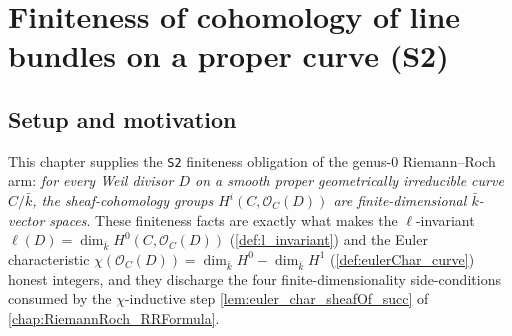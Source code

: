 \chapter{Finiteness of cohomology of line bundles on a proper curve (S2)}
\label{chap:Cohomology_SerreFiniteness}

\providecommand{\cechHI}{\mathtt{cechH1}}
\providecommand{\FiniteDimensional}{\mathrm{FiniteDimensional}}


\section{Setup and motivation}

This chapter supplies the \texttt{S2} finiteness obligation of the
genus-\(0\) Riemann--Roch arm: \emph{for every Weil divisor \(D\) on a
smooth proper geometrically irreducible curve \(C / \bar k\), the
sheaf-cohomology groups \(H^i(C, \mathcal O_C(D))\) are
finite-dimensional \(\bar k\)-vector spaces}. These finiteness facts are
exactly what makes the \(\ell\)-invariant \(\ell(D) = \dim_{\bar k}
H^0(C, \mathcal O_C(D))\) (\cref{def:l_invariant}) and the Euler
characteristic \(\chi(\mathcal O_C(D)) = \dim_{\bar k} H^0 -
\dim_{\bar k} H^1\) (\cref{def:eulerChar_curve}) honest integers, and
they discharge the four finite-dimensionality side-conditions consumed
by the \(\chi\)-inductive step
\cref{lem:euler_char_sheafOf_succ} of \cref{chap:RiemannRoch_RRFormula}.

